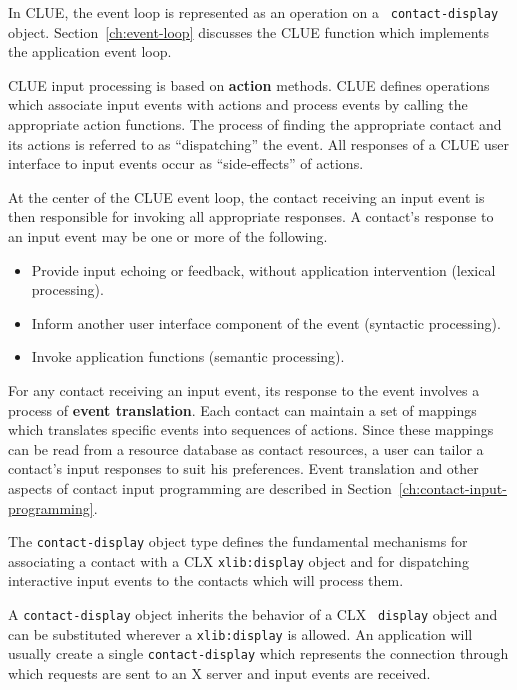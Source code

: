 \documentclass[twoside]{book}
\begin{document}
\begin{sloppy}
In CLUE, the event loop is represented as an operation on a {\tt
contact-display} object. Section~\ref{ch:event-loop} discusses the CLUE function
which implements the application event loop.

CLUE input processing is based on {\bf action} methods.
CLUE defines  operations which
associate input events with actions and  process events by
calling the appropriate action functions.
The process of finding the appropriate contact and its actions is
referred to as ``dispatching'' the event.
All responses of a CLUE user
interface to input events occur as ``side-effects'' of actions. 


At the center of the CLUE event loop,
the contact receiving an input event is then responsible for invoking all
appropriate responses. A contact's
response to an input event may be one or more of the following.
\begin{itemize}
\item Provide input echoing or feedback, without application intervention
(lexical processing).
\item Inform another  user interface component of the
event (syntactic processing).
\item Invoke application functions
(semantic processing).
\end{itemize}
 
For any contact receiving an input event, its response to the event involves a
process of {\bf event translation}.
Each contact can maintain a set of mappings which translates  specific events
into sequences of actions. Since
these
mappings can be read from a resource database
as contact resources, a user can tailor a contact's input responses to suit his
preferences. Event translation and other aspects of contact input programming are
described in Section~\ref{ch:contact-input-programming}.

The {\tt contact-display} object type defines the fundamental mechanisms for
associating
a contact  with a CLX {\tt xlib:display} object and for dispatching
interactive input events to the contacts which will process them.


A {\tt contact-display} object inherits the behavior of a CLX {\tt
display} object
and can be substituted wherever a 
{\tt xlib:display} is allowed\footnotemark{}. An application will usually create a single {\tt contact-display} which
represents the connection through which requests are sent to an X server and input events are received.


\end{sloppy}
\end{document}
